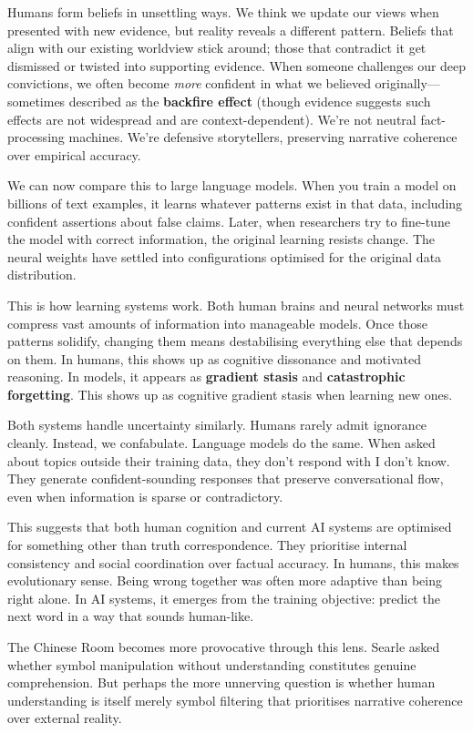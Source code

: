
\newpage

\begin{commentary}
Humans form beliefs in unsettling ways. We think we update our views when presented with new evidence, but reality reveals a different pattern. Beliefs that align with our existing worldview stick around; those that contradict it get dismissed or twisted into supporting evidence. When someone challenges our deep convictions, we often become \textit{more} confident in what we believed originally—sometimes described as the \textbf{backfire effect} (though evidence suggests such effects are not widespread and are context-dependent). We're not neutral fact-processing machines. We're defensive storytellers, preserving narrative coherence over empirical accuracy.

We can now compare this to large language models. When you train a model on billions of text examples, it learns whatever patterns exist in that data, including confident assertions about false claims. Later, when researchers try to fine-tune the model with correct information, the original learning resists change. The neural weights have settled into configurations optimised for the original data distribution.

This is how learning systems work. Both human brains and neural networks must compress vast amounts of information into manageable models. Once those patterns solidify, changing them means destabilising everything else that depends on them. In humans, this shows up as cognitive dissonance and motivated reasoning. In models, it appears as \textbf{gradient stasis} and \textbf{catastrophic forgetting}. This shows up as cognitive gradient stasis when learning new ones.

Both systems handle uncertainty similarly. Humans rarely admit ignorance cleanly. Instead, we confabulate. Language models do the same. When asked about topics outside their training data, they don't respond with \QENOpen{}I don't know.\QENClose{} They generate confident-sounding responses that preserve conversational flow, even when information is sparse or contradictory.

This suggests that both human cognition and current AI systems are optimised for something other than truth correspondence. They prioritise internal consistency and social coordination over factual accuracy. In humans, this makes evolutionary sense. Being wrong together was often more adaptive than being right alone. In AI systems, it emerges from the training objective: predict the next word in a way that sounds human-like.

The Chinese Room becomes more provocative through this lens. Searle asked whether symbol manipulation without understanding constitutes genuine comprehension. But perhaps the more unnerving question is whether human \QSOpen{}understanding\QSClose{} is itself merely symbol filtering that prioritises narrative coherence over external reality.
\end{commentary}

